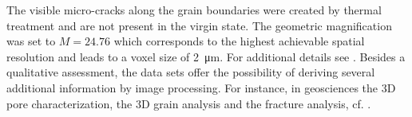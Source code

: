 The visible micro-cracks along the grain boundaries were created by thermal treatment and are not present in the virgin state.  The geometric magnification was set to $M = 24.76$ which corresponds to the highest achievable spatial resolution and leads to a voxel size of \SI{2}{\micro\meter}. For additional details see \cite{Ruf2020}. Besides a qualitative assessment, the data sets offer the possibility of deriving several additional information by image processing. For instance, in geosciences the 3D pore characterization, the 3D grain analysis and the fracture analysis, cf. \cite{Cnudde2013}. 